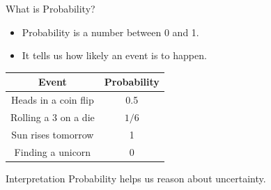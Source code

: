 \documentclass{beamer}
\begin{document}
\begin{frame}{What is Probability?}
\begin{itemize}
  \item Probability is a number between 0 and 1.
  \item It tells us how likely an event is to happen.
\end{itemize}

\vspace{1cm}

\begin{center}
\begin{tabular}{|c|c|}
\hline
Event & Probability \\
\hline
Heads in a coin flip & 0.5 \\
Rolling a 3 on a die & $1/6$ \\
Sun rises tomorrow & 1 \\
Finding a unicorn & 0 \\
\hline
\end{tabular}
\end{center}

\vspace{0.5cm}
\begin{block}{Interpretation}
\centering
Probability helps us reason about uncertainty.
\end{block}
\end{frame}
\end{document}
